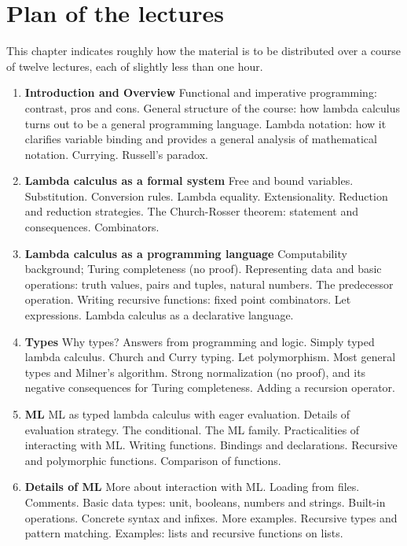 \chapter*{Plan of the lectures}

This chapter indicates roughly how the material is to be distributed over a
course of twelve lectures, each of slightly less than one hour.

\begin{enumerate}

\item {\bf Introduction and Overview} Functional and imperative programming:
contrast, pros and cons. General structure of the course: how lambda calculus
turns out to be a general programming language. Lambda notation: how it
clarifies variable binding and provides a general analysis of mathematical
notation. Currying. Russell's paradox.

\item {\bf Lambda calculus as a formal system} Free and bound variables.
Substitution. Conversion rules. Lambda equality. Extensionality. Reduction and
reduction strategies. The Church-Rosser theorem: statement and consequences.
Combinators.

\item {\bf Lambda calculus as a programming language} Computability background;
Turing completeness (no proof). Representing data and basic operations: truth
values, pairs and tuples, natural numbers. The predecessor operation. Writing
recursive functions: fixed point combinators. Let expressions. Lambda calculus
as a declarative language.

\item {\bf Types} Why types? Answers from programming and logic. Simply typed
lambda calculus. Church and Curry typing. Let polymorphism. Most general types
and Milner's algorithm. Strong normalization (no proof), and its negative
consequences for Turing completeness. Adding a recursion operator.

\item {\bf ML} ML as typed lambda calculus with eager evaluation. Details of
evaluation strategy. The conditional. The ML family. Practicalities of
interacting with ML. Writing functions. Bindings and declarations. Recursive
and polymorphic functions. Comparison of functions.

\item {\bf Details of ML} More about interaction with ML. Loading from files.
Comments. Basic data types: unit, booleans, numbers and strings. Built-in
operations. Concrete syntax and infixes. More examples. Recursive types and
pattern matching. Examples: lists and recursive functions on lists.


\end{enumerate}
